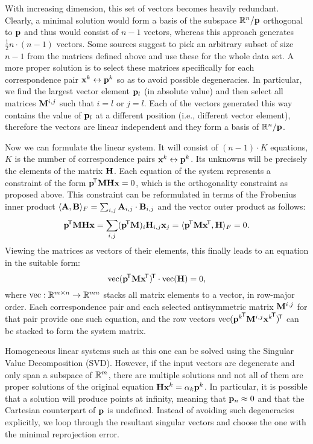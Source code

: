 With increasing dimension, this set of vectors becomes heavily redundant.
Clearly, a minimal solution would form a basis of the subspace $\mathbb{R}^n / \mathbf{p}$ orthogonal to $\mathbf{p}$ and thus would consist of $n - 1$ vectors, whereas this approach generates $\frac {1} {2} n \cdot (n - 1)$ vectors.
Some sources\cite{MVG} suggest to pick an arbitrary subset of size $n - 1$ from the matrices defined above and use these for the whole data set.
A more proper solution is to select these matrices specifically for each correspondence pair $\mathbf{x}^k \leftrightarrow \mathbf{p}^k$ so as to avoid possible degeneracies.
In particular, we find the largest vector element $\mathbf{p}_l$ (in absolute value) and then select all matrices $\mathbf{M}^{i, j}$ such that $i = l$ or $j = l$.
Each of the vectors generated this way contains the value of $\mathbf{p}_l$ at a different position (i.e., different vector element), therefore the vectors are linear independent and they form a basis of $\mathbb{R}^n / \mathbf{p}$.

Now we can formulate the linear system.
It will consist of $(n - 1) \cdot K$ equations, $K$ is the number of correspondence pairs $\mathbf{x}^k \leftrightarrow \mathbf{p}^k$.
Its unknowns will be precisely the elements of the matrix $\mathbf{H}$.
Each equation of the system represents a constraint of the form $\mathbf{p}^{\!\mathsf{T}} \mathbf{M} \mathbf{H} \mathbf{x} = 0$, which is the orthogonality constraint as proposed above.
This constraint can be reformulated in terms of the Frobenius inner product $\langle \mathbf{A}, \mathbf{B} \rangle_F = \sum_{i, j} \mathbf{A}_{i, j} \cdot \mathbf{B}_{i, j}$ and the vector outer product as follows:
$$\mathbf{p}^{\!\mathsf{T}} \mathbf{M} \mathbf{H} \mathbf{x} = \sum_{i, j} (\mathbf{p}^{\!\mathsf{T}} \mathbf{M})_i \mathbf{H}_{i, j} \mathbf{x}_j = \langle \mathbf{p}^{\!\mathsf{T}} \mathbf{M} \mathbf{x}^{\!\mathsf{T}}, \mathbf{H} \rangle_F = 0.$$
Viewing the matrices as vectors of their elements, this finally leads to an equation in the suitable form:
$$\textrm{vec} (\mathbf{p}^{\!\mathsf{T}} \mathbf{M} \mathbf{x}^{\!\mathsf{T}})^{\!\mathsf{T}} \cdot \textrm{vec}(\mathbf{H}) = 0,$$
where $\textrm{vec} : \mathbb{R}^{m \times n} \rightarrow \mathbb{R}^{mn}$ stacks all matrix elements to a vector, in row-major order.
Each correspondence pair and each selected antisymmetric matrix $\mathbf{M}^{i, j}$ for that pair provide one such equation, and the row vectors $\textrm{vec} ({\mathbf{p}^k}^{\!\mathsf{T}} \mathbf{M}^{i, j} {\mathbf{x}^k}^{\!\mathsf{T}})^{\!\mathsf{T}}$ can be stacked to form the system matrix.

Homogeneous linear systems such as this one can be solved using the Singular Value Decomposition (SVD).
However, if the input vectors are degenerate and only span a subspace of $\mathbb{R}^m$, there are multiple solutions and not all of them are proper solutions of the original equation $\mathbf{H} \mathbf{x}^k = \alpha_k \mathbf{p}^k$.
In particular, it is possible that a solution will produce points at infinity, meaning that $\mathbf{p}_n \approx 0$ and that the Cartesian counterpart of $\mathbf{p}$ is undefined.
Instead of avoiding such degeneracies explicitly, we loop through the resultant singular vectors and choose the one with the minimal reprojection error.
